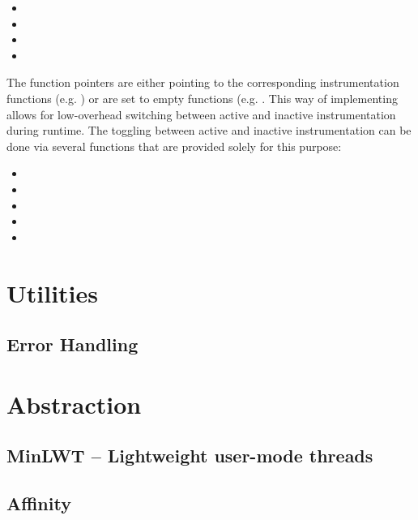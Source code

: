\begin{itemize} 
	\item {} 
	\item {} 
	\item {} 
	\item {} 
\end{itemize}

The function pointers are either pointing to the corresponding instrumentation
functions (e.g. ) or are set to
empty functions (e.g. . This way
of implementing allows for low-overhead switching between active and inactive
instrumentation during runtime. The toggling between active and inactive
instrumentation can be done via several functions that are provided solely for
this purpose:

\begin{itemize} 
	\item {} 
	\item {} 
	\item {} 
	\item {} 
	\item {} 
\end{itemize}


\section{Utilities} 
\subsection{Error Handling} 
\section{Abstraction}
\subsection{MinLWT -- Lightweight user-mode threads} 
\subsection{Affinity}
